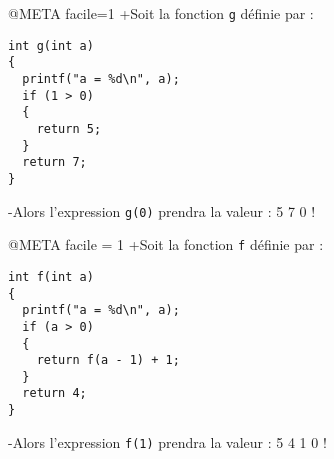 @META facile=1
+Soit la fonction \verb|g| définie par :
\begin{verbatim}
int g(int a)
{
  printf("a = %d\n", a);
  if (1 > 0)
  {
    return 5;
  }
  return 7;
}
\end{verbatim}
-Alors l'expression \verb|g(0)| prendra la valeur :
 5
 7
 0
!

@META facile = 1
+Soit la fonction \verb|f| définie par :
\begin{verbatim}
int f(int a)
{
  printf("a = %d\n", a);
  if (a > 0)
  {
    return f(a - 1) + 1;
  }
  return 4;
}
\end{verbatim}
-Alors l'expression \verb|f(1)| prendra la valeur :
 5
 4
 1
 0
!
